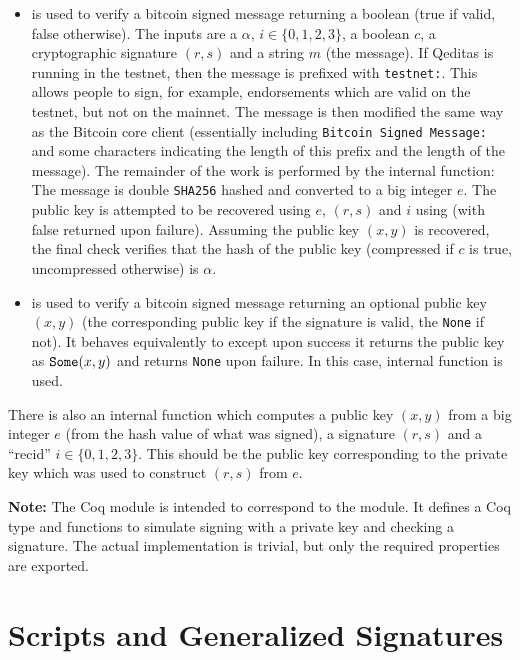 \begin{itemize}
\item {} is used to verify a bitcoin signed message returning a boolean (true if valid, false otherwise).
The inputs are a {} $\alpha$, $i\in\{0,1,2,3\}$, a boolean $c$, a cryptographic signature $(r,s)$
and a string $m$ (the message).
If Qeditas is running in the testnet, then the message is prefixed with {\tt{testnet:}}.
This allows people to sign, for example, endorsements which are valid on the testnet, but not on the mainnet.
The message is then modified the same way as the Bitcoin core client (essentially
including {\tt{Bitcoin Signed Message:}} and some characters indicating the length of this prefix and the length of the message).
The remainder of the work is performed by the internal {} function:
The message is double {\tt{SHA256}} hashed and converted to a big integer $e$.
The public key is attempted to be recovered
using $e$, $(r,s)$ and $i$ using {} (with false returned upon failure).
Assuming the public key $(x,y)$ is recovered, the final check verifies that the hash of the public key
(compressed if $c$ is true, uncompressed otherwise) is $\alpha$.
\item {} is used to verify a bitcoin signed message returning an optional public key $(x,y)$ (the corresponding public key if the signature is valid, the {\tt{None}} if not).
It behaves equivalently to {}
except upon success it returns the public key as ${\tt{Some}}(x,y)$
and returns {\tt{None}} upon failure.
In this case, internal {} function is used.
\end{itemize}

There is also an internal function {} which
computes a public key $(x,y)$
from a big integer $e$ (from the hash value of what was signed), a signature $(r,s)$ and a ``recid'' $i\in\{0,1,2,3\}$.
This should be the public key corresponding to the private key which was used to construct $(r,s)$
from $e$.

{\bf{Note:}} The Coq module {} is intended to correspond to
the {} module. It defines a Coq type {} and functions
to simulate signing with a private key and checking a signature.
The actual implementation is trivial, but only the required properties are exported.

\section{Scripts and Generalized Signatures}

